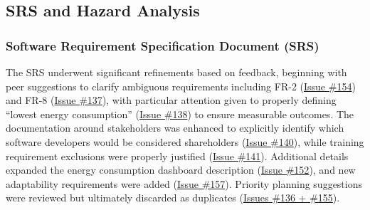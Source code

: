 \documentclass{article}
\begin{document}


\subsection{SRS and Hazard Analysis}

\subsubsection{Software Requirement Specification Document (SRS)}

The SRS underwent significant refinements based on feedback, beginning with peer suggestions to clarify ambiguous requirements including FR-2 (\href{https://github.com/ssm-lab/capstone--source-code-optimizer/issues/154}{Issue \#154}) and FR-8 (\href{https://github.com/ssm-lab/capstone--source-code-optimizer/issues/137}{Issue \#137}), with particular attention given to properly defining ``lowest energy consumption'' (\href{https://github.com/ssm-lab/capstone--source-code-optimizer/issues/138}{Issue \#138}) to ensure measurable outcomes. The documentation around stakeholders was enhanced to explicitly identify which software developers would be considered shareholders (\href{https://github.com/ssm-lab/capstone--source-code-optimizer/issues/140}{Issue \#140}), while training requirement exclusions were properly justified (\href{https://github.com/ssm-lab/capstone--source-code-optimizer/issues/141}{Issue \#141}). Additional details expanded the energy consumption dashboard description (\href{https://github.com/ssm-lab/capstone--source-code-optimizer/issues/152}{Issue \#152}), and new adaptability requirements were added (\href{https://github.com/ssm-lab/capstone--source-code-optimizer/issues/157}{Issue \#157}). Priority planning suggestions were reviewed but ultimately discarded as duplicates (\href{https://github.com/ssm-lab/capstone--source-code-optimizer/issues/155}{Issues \#136 + \#155}).
\end{document}
